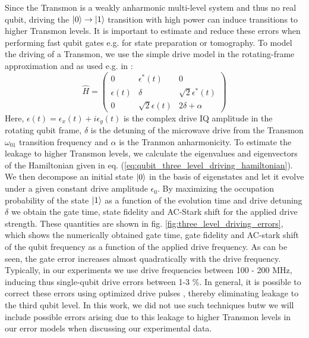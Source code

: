 Since the Transmon is a weakly anharmonic multi-level system and thus no real qubit, driving the $\left| 0 \right>\to\left| 1 \right>$ transition with high power can induce transitions to higher Transmon levels. It is important to estimate and reduce these errors when performing fast qubit gates e.g. for state preparation or tomography. To model the driving of a Transmon, we use the simple drive model in the rotating-frame approximation and as used e.g. in \cite{motzoi_simple_2009}:
%
\begin{equation}
\hat{H} = \left(
						 \begin{array}{ccc}
						0 & \epsilon^*(t) & 0 \\
						\epsilon(t) & \delta & \sqrt{2}\epsilon^*(t) \\
						0 & \sqrt{2}\epsilon(t) & 2\delta + \alpha
						\end{array}
					\right) \label{eq:qubit_three_level_driving_hamiltonian}
\end{equation}
%
Here, $\epsilon(t) = \epsilon_x(t)+i\epsilon_y(t)$ is the complex drive IQ amplitude in the rotating qubit frame, $\delta$ is the detuning of the microwave drive from the Transmon $\omega_{01}$ transition frequency and $\alpha$ is the Tranmon anharmonicity. To estimate the leakage to higher Transmon levels, we calculate the eigenvalues and eigenvectors of the Hamiltonian given in eq. (\ref{eq:qubit_three_level_driving_hamiltonian}). We then decompose an initial state $\left| 0 \right>$ in the basis of eigenstates and let it evolve under a given constant drive amplitude $\epsilon_0$. By maximizing the occupation probability of the state $\left| 1 \right>$ as a function of the evolution time and drive detuning $\delta$ we obtain the gate time, state fidelity and AC-Stark shift for the applied drive strength. These quantities are shown in fig. \ref{fig:three_level_driving_errors}, which shows the numerically obtained gate time, gate fidelity and AC-stark shift of the qubit frequency as a function of the applied drive frequency. As can be seen, the gate error increases almost quadratically with the drive frequency. Typically, in our experiments we use drive frequencies between 100 - 200 MHz, inducing thus single-qubit drive errors between 1-3 \%. In general, it is possible to correct these errors using optimized drive pulses \cite{}, thereby eliminating leakage to the third qubit level. In this work, we did not use such techniques butw we will  include possible errors arising due to this leakage to higher Transmon levels in our error models when discussing our experimental data.

